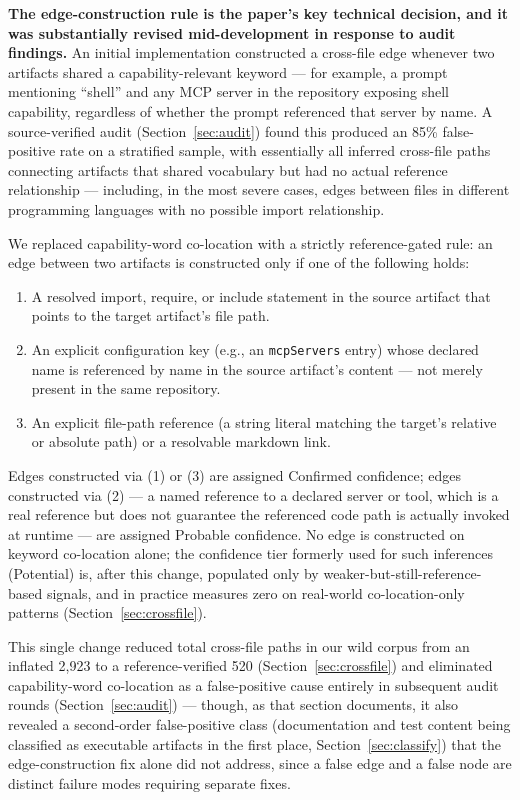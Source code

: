 \documentclass[sigconf,anonymous,review]{acmart}
\begin{document}
\textbf{The edge-construction rule is the paper's key technical decision, and it was substantially revised mid-development in response to audit findings.} An initial implementation constructed a cross-file edge whenever two artifacts shared a capability-relevant keyword --- for example, a prompt mentioning ``shell'' and any MCP server in the repository exposing shell capability, regardless of whether the prompt referenced that server by name. A source-verified audit (Section~\ref{sec:audit}) found this produced an 85\% false-positive rate on a stratified sample, with essentially all inferred cross-file paths connecting artifacts that shared vocabulary but had no actual reference relationship --- including, in the most severe cases, edges between files in different programming languages with no possible import relationship.

We replaced capability-word co-location with a strictly reference-gated rule: an edge between two artifacts is constructed only if one of the following holds:
\begin{enumerate}
\item A resolved import, require, or include statement in the source artifact that points to the target artifact's file path.
\item An explicit configuration key (e.g., an \texttt{mcpServers} entry) whose declared name is referenced by name in the source artifact's content --- not merely present in the same repository.
\item An explicit file-path reference (a string literal matching the target's relative or absolute path) or a resolvable markdown link.
\end{enumerate}
Edges constructed via (1) or (3) are assigned Confirmed confidence; edges constructed via (2) --- a named reference to a declared server or tool, which is a real reference but does not guarantee the referenced code path is actually invoked at runtime --- are assigned Probable confidence. No edge is constructed on keyword co-location alone; the confidence tier formerly used for such inferences (Potential) is, after this change, populated only by weaker-but-still-reference-based signals, and in practice measures zero on real-world co-location-only patterns (Section~\ref{sec:crossfile}).

This single change reduced total cross-file paths in our wild corpus from an inflated 2{,}923 to a reference-verified 520 (Section~\ref{sec:crossfile}) and eliminated capability-word co-location as a false-positive cause entirely in subsequent audit rounds (Section~\ref{sec:audit}) --- though, as that section documents, it also revealed a second-order false-positive class (documentation and test content being classified as executable artifacts in the first place, Section~\ref{sec:classify}) that the edge-construction fix alone did not address, since a false edge and a false node are distinct failure modes requiring separate fixes.
\end{document}
